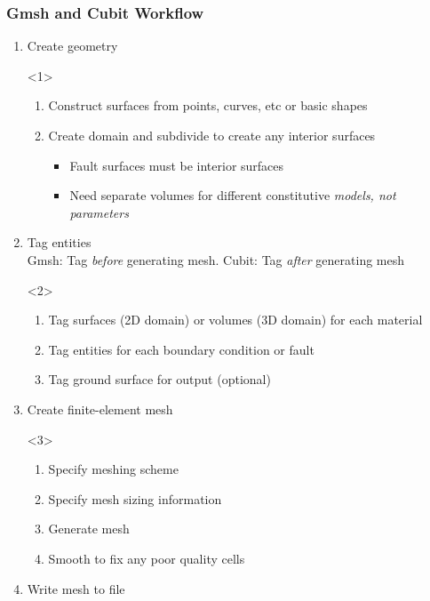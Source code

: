 \documentclass[aspectratio=169]{beamer}
\begin{document}
\begin{frame}[t]
  \frametitle{Gmsh and Cubit Workflow}
  \summary{}

  \begin{enumerate}
  \item Create geometry
    \begin{onlyenv}<1>
      \begin{enumerate}
      \item Construct surfaces from points, curves, etc or basic shapes
      \item Create domain and subdivide to create any interior surfaces
        \begin{itemize}
        \item Fault surfaces must be interior surfaces
        \item Need separate volumes for different constitutive {\em models, not parameters}
        \end{itemize}
      \end{enumerate}
    \end{onlyenv}
  \item Tag entities\\
    Gmsh: Tag {\em before} generating mesh. Cubit: Tag {\em after} generating mesh
    \begin{onlyenv}<2>
      \begin{enumerate}
      \item Tag surfaces (2D domain) or volumes (3D domain) for each material
      \item Tag entities for each boundary condition or fault
      \item Tag ground surface for output (optional)
      \end{enumerate}
    \end{onlyenv}
  \item Create finite-element mesh
    \begin{onlyenv}<3>
      \begin{enumerate}
      \item Specify meshing scheme
      \item Specify mesh sizing information
      \item Generate mesh
      \item Smooth to fix any poor quality cells
      \end{enumerate}
    \end{onlyenv}
  \item Write mesh to file
  \end{enumerate}

\end{frame}
\end{document}
